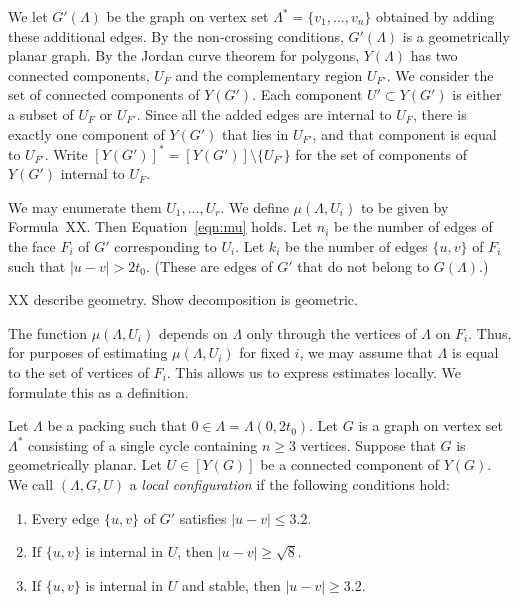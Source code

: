 We let $G'(\Lambda)$ be the graph on vertex set $\Lambda^*=\{v_1,\ldots,v_n\}$ obtained by adding these additional edges.  By the non-crossing
conditions, $G'(\Lambda)$ is a geometrically planar graph.  
By the Jordan curve theorem for polygons, $Y(\Lambda)$ has two connected 
components,
$U_F$ and the complementary region $U_{F'}$.
We consider the set of connected components of $Y(G')$.  Each
component $U'\subset Y(G')$ is either a subset of $U_F$ or $U_{F'}$.
Since all the added edges are internal to $U_F$, there is exactly
one component of $Y(G')$ that lies in $U_{F'}$, and that component
is equal to $U_{F'}$.  Write $[Y(G')]^* = [Y(G')]\setminus\{U_{F'}\}$
for the set of components of $Y(G')$ internal to $U_F$.

We may enumerate them $U_1,\ldots,U_r$.  We define
$\mu(\Lambda,U_i)$ to be given by Formula~XX.  Then
Equation~\ref{eqn:mu} holds.  Let $n_i$ be the number of edges of the face
$F_i$ of $G'$ corresponding to $U_i$.  Let $k_i$ be the number of edges
$\{u,v\}$
of $F_i$ such that $|u-v|> 2t_0$. (These are edges of $G'$ that do not
belong to $G(\Lambda)$.)  

XX describe geometry. Show decomposition is geometric.

The function $\mu(\Lambda,U_i)$ depends on $\Lambda$ only through
the vertices of $\Lambda$ on $F_i$.  Thus, for purposes of estimating
$\mu(\Lambda,U_i)$ for fixed $i$, we may assume that $\Lambda$
is equal to the set of vertices of $F_i$.  This allows us to express
estimates locally.  We formulate this as a definition.

\begin{definition}
Let $\Lambda$ be a packing such that $0\in\Lambda=\Lambda(0,2t_0)$.  
Let $G$ is a graph on vertex set $\Lambda^*$ 
consisting
of a single cycle containing $n\ge 3$ vertices.  
Suppose that $G$ is geometrically planar. 
Let $U\in [Y(G)]$ be a connected component of $Y(G)$.  
We call $(\Lambda,G,U)$ a {\it local configuration} if the
following conditions hold:
\begin{enumerate}
\item Every edge $\{u,v\}$ of $G'$ satisfies $|u-v|\le 3.2$.
\item If
$\{u,v\}$ is internal in  $U$, then $|u-v|\ge \sqrt8$.
\item If $\{u,v\}$ is internal in $U$ and stable,
then $|u-v|\ge 3.2$.
\end{enumerate}
\end{definition}

